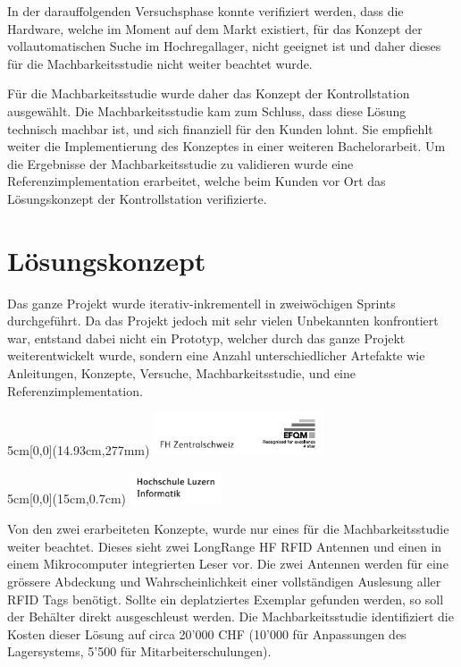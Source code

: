 \documentclass[
	a4paper
]{scrartcl}
\begin{document}
In der darauffolgenden Versuchsphase konnte verifiziert werden, dass die Hardware, welche im Moment auf dem Markt existiert, für das Konzept der vollautomatischen Suche im Hochregallager, nicht geeignet ist und daher dieses für die Machbarkeitsstudie nicht weiter beachtet wurde.

Für die Machbarkeitsstudie wurde daher das Konzept der Kontrollstation ausgewählt. Die Machbarkeitsstudie kam zum Schluss, dass diese Lösung technisch machbar ist, und sich finanziell für den Kunden lohnt. Sie empfiehlt weiter die Implementierung des Konzeptes in einer weiteren Bachelorarbeit. Um die Ergebnisse der Machbarkeitsstudie zu validieren wurde eine Referenzimplementation erarbeitet, welche beim Kunden vor Ort das Lösungskonzept der Kontrollstation verifizierte.

\section{Lösungskonzept}
Das ganze Projekt wurde iterativ-inkrementell in zweiwöchigen Sprints durchgeführt. Da das Projekt jedoch mit sehr vielen Unbekannten konfrontiert war, entstand dabei nicht ein Prototyp, welcher durch das ganze Projekt weiterentwickelt wurde, sondern eine Anzahl unterschiedlicher Artefakte wie Anleitungen, Konzepte, Versuche, Machbarkeitsstudie, und eine Referenzimplementation.

\begin{textblock*}{5cm}[0,0](14.93cm,277mm)
	\includegraphics[keepaspectratio,width=5cm]{img/FHZ_Logo}
\end{textblock*}

\newpage

\begin{textblock*}{5cm}[0,0](15cm,0.7cm)
	\includegraphics[keepaspectratio,width=2.7cm]{img/HSLU_Logo_Header}
\end{textblock*}

Von den zwei erarbeiteten Konzepte, wurde nur eines für die Machbarkeitsstudie weiter beachtet. Dieses sieht zwei LongRange HF RFID Antennen und einen in einem Mikrocomputer integrierten Leser vor. Die zwei Antennen werden für eine grössere Abdeckung und Wahrscheinlichkeit einer vollständigen Auslesung aller RFID Tags benötigt. Sollte ein deplatziertes Exemplar gefunden werden, so soll der Behälter direkt ausgeschleust werden. Die Machbarkeitsstudie identifiziert die Kosten dieser Lösung auf circa 20'000 CHF (10'000 für Anpassungen des Lagersystems, 5'500 für Mitarbeiterschulungen).
\end{document}
